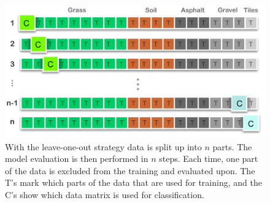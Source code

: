 



\begin{figure}[h]
	\label{fig:loo}
	\centering
	\includegraphics[scale=0.7]{figs_temp/loo.jpg}
	\caption{With the leave-one-out strategy data is split up into $n$ parts. The model evaluation is then performed in $n$ steps. Each time, one part of the data is excluded from the training and evaluated upon. The T's mark which parts of the data that are used for training, and the C's show which data matrix is used for classification.}
\end{figure}


